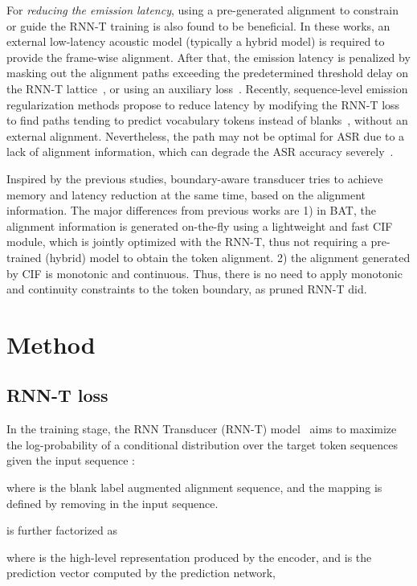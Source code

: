 \documentclass{INTERSPEECH2023}
\begin{document}
For \emph{reducing the emission latency}, using a pre-generated alignment to constrain or guide the RNN-T training is also found to be beneficial. In these works, an external low-latency acoustic model (typically a hybrid model) is required to provide the frame-wise alignment. After that, the emission latency is penalized by masking out the alignment paths exceeding the predetermined threshold delay on the RNN-T lattice~\cite{ar-rnnt, EmittingWT}, or using an auxiliary loss~\cite{inaguma2020minimum}. Recently, sequence-level emission regularization methods propose to reduce latency by modifying the RNN-T loss to find paths tending to predict vocabulary tokens instead of blanks~\cite{fastemit, Delay-penalized}, without an external alignment. Nevertheless, the path may not be optimal for ASR due to a lack of alignment information, which can degrade the ASR accuracy severely~\cite{kim2021reducing, Delay-penalized}.

Inspired by the previous studies,  boundary-aware transducer tries to achieve memory and latency reduction at the same time, based on the alignment information. The major differences from previous works are 1) in BAT, the alignment information is generated on-the-fly using a lightweight and fast CIF module, which is jointly optimized with the RNN-T, thus not requiring a pre-trained (hybrid) model to obtain the token alignment. 2) the alignment generated by CIF is monotonic and continuous. Thus, there is no need to apply monotonic and continuity constraints to the token boundary, as pruned RNN-T did. 

\section{Method}
\subsection{RNN-T loss}
In the training stage, the RNN Transducer (RNN-T) model~\cite{rnn-t} aims to maximize the log-probability of a conditional distribution over the target token sequences  given the input sequence :

where  is the blank label  augmented alignment sequence, and the mapping  is defined by removing  in the input sequence. 

 is further factorized as

where  is the high-level representation produced by the encoder, and  is the prediction vector computed by the prediction network,
\end{document}
